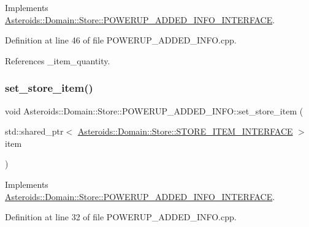 Implements \hyperlink{classAsteroids_1_1Domain_1_1Store_1_1POWERUP__ADDED__INFO__INTERFACE_ae3d0100c74762789aa0250e32c51fb36}{Asteroids\+::\+Domain\+::\+Store\+::\+P\+O\+W\+E\+R\+U\+P\+\_\+\+A\+D\+D\+E\+D\+\_\+\+I\+N\+F\+O\+\_\+\+I\+N\+T\+E\+R\+F\+A\+CE}.



Definition at line 46 of file P\+O\+W\+E\+R\+U\+P\+\_\+\+A\+D\+D\+E\+D\+\_\+\+I\+N\+F\+O.\+cpp.



References \+\_\+item\+\_\+quantity.

\mbox{\label{classAsteroids_1_1Domain_1_1Store_1_1POWERUP__ADDED__INFO_ad2b9413bde9663792a39c4bff9503ecf}} 
\subsubsection{\texorpdfstring{set\+\_\+store\+\_\+item()}{set\_store\_item()}}
{\footnotesize\ttfamily void Asteroids\+::\+Domain\+::\+Store\+::\+P\+O\+W\+E\+R\+U\+P\+\_\+\+A\+D\+D\+E\+D\+\_\+\+I\+N\+F\+O\+::set\+\_\+store\+\_\+item (\begin{DoxyParamCaption}\item[{std\+::shared\+\_\+ptr$<$ \hyperlink{classAsteroids_1_1Domain_1_1Store_1_1STORE__ITEM__INTERFACE}{Asteroids\+::\+Domain\+::\+Store\+::\+S\+T\+O\+R\+E\+\_\+\+I\+T\+E\+M\+\_\+\+I\+N\+T\+E\+R\+F\+A\+CE} $>$}]{item }\end{DoxyParamCaption})\hspace{0.3cm}{\ttfamily [virtual]}}



Implements \hyperlink{classAsteroids_1_1Domain_1_1Store_1_1POWERUP__ADDED__INFO__INTERFACE_a16f5e557d71b54dc716863d619bd1549}{Asteroids\+::\+Domain\+::\+Store\+::\+P\+O\+W\+E\+R\+U\+P\+\_\+\+A\+D\+D\+E\+D\+\_\+\+I\+N\+F\+O\+\_\+\+I\+N\+T\+E\+R\+F\+A\+CE}.



Definition at line 32 of file P\+O\+W\+E\+R\+U\+P\+\_\+\+A\+D\+D\+E\+D\+\_\+\+I\+N\+F\+O.\+cpp.



